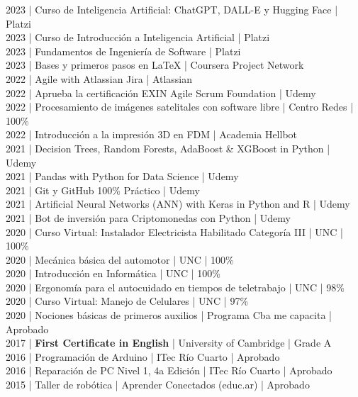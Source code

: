{2023 | Curso de Inteligencia Artificial: ChatGPT, DALL-E y Hugging Face | Platzi \\
2023 | Curso de Introducción a Inteligencia Artificial | Platzi \\
2023 | Fundamentos de Ingeniería de Software | Platzi \\
2023 | Bases y primeros pasos en LaTeX | Coursera Project Network \\
2022 | Agile with Atlassian Jira | Atlassian \\
2022 | Aprueba la certificación EXIN Agile Scrum Foundation | Udemy \\
2022 | Procesamiento de imágenes satelitales con software libre | Centro Redes | 100\% \\
2022 | Introducción a la impresión 3D en FDM | Academia Hellbot \\
2021 | Decision Trees, Random Forests, AdaBoost \& XGBoost in Python | Udemy \\
2021 | Pandas with Python for Data Science | Udemy \\
2021 | Git y GitHub 100\% Práctico | Udemy \\
2021 | Artificial Neural Networks (ANN) with Keras in Python and R | Udemy \\
2021 | Bot de inversión para Criptomonedas con Python | Udemy \\
2020 | Curso Virtual: Instalador Electricista Habilitado Categoría III | UNC | 100\% \\
2020 | Mecánica básica del automotor | UNC | 100\% \\
2020 | Introducción en Informática | UNC | 100\% \\
2020 | Ergonomía para el autocuidado en tiempos de teletrabajo | UNC | 98\% \\
2020 | Curso Virtual: Manejo de Celulares | UNC | 97\% \\
2020 | Nociones básicas de primeros auxilios | Programa Cba me capacita | Aprobado \\
2017 | \textbf{First Certificate in English} | University of Cambridge | Grade A \\
2016 | Programación de Arduino | ITec Río Cuarto | Aprobado \\
2016 | Reparación de PC Nivel 1, 4a Edición | ITec Río Cuarto | Aprobado \\
2015 | Taller de robótica | Aprender Conectados (educ.ar) | Aprobado \\
}
